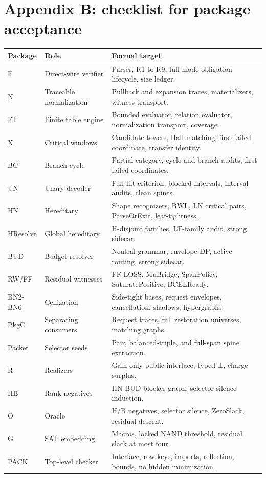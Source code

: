 \documentclass[10.5pt,a4paper]{article}
\newcommand{\Bot}{\bot}
\begin{document}
\section{Appendix B: checklist for package acceptance}
\begin{longtable}{>{\raggedright\arraybackslash}p{}p{}p{}}
\toprule
Package & Role & Formal target\\
\midrule
E & Direct-wire verifier & Parser, R1 to R9, full-mode obligation lifecycle, size ledger.\\
N & Traceable normalization & Pullback and expansion traces, materializers, witness transport.\\
FT & Finite table engine & Bounded evaluator, relation evaluator, normalization transport, coverage.\\
X & Critical windows & Candidate towers, Hall matching, first failed coordinate, transfer identity.\\
BC & Branch-cycle & Partial category, cycle and branch audits, first failed coordinates.\\
UN & Unary decoder & Full-lift criterion, blocked intervals, interval audits, clean spines.\\
HN & Hereditary & Shape recognizers, BWL, LN critical pairs, ParseOrExit, leaf-tightness.\\
HResolve & Global hereditary & H-disjoint families, LT-family audit, strong sidecar.\\
BUD & Budget resolver & Neutral grammar, envelope DP, active routing, strong sidecar.\\
RW/FF & Residual witnesses & FF-LOSS, MuBridge, SpanPolicy, SaturatePositive, BCELReady.\\
BN2-BN6 & Cellization & Side-tight bases, request envelopes, cancellation, shadows, hypergraphs.\\
PkgC & Separating consumers & Request traces, full restoration universes, matching graphs.\\
Packet & Selector seeds & Pair, balanced-triple, and full-span spine extraction.\\
R & Realizers & Gain-only public interface, typed \(\Bot\), charge surplus.\\
HB & Rank negatives & HN-BUD blocker graph, selector-silence induction.\\
O & Oracle & H/B negatives, selector silence, ZeroSlack, residual descent.\\
G & SAT embedding & Macros, locked NAND threshold, residual slack at most four.\\
PACK & Top-level checker & Interface, row keys, imports, reflection, bounds, no hidden minimization.\\
\bottomrule
\end{longtable}
\end{document}
